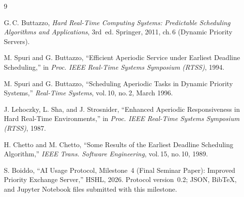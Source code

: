 \documentclass[conference]{IEEEtran}
\begin{document}
\begin{thebibliography}{9}

G.\,C. Buttazzo,
\emph{Hard Real-Time Computing Systems: Predictable Scheduling
  Algorithms and Applications}, 3rd~ed.
Springer, 2011, ch.\,6 (Dynamic Priority Servers).

M. Spuri and G. Buttazzo,
``Efficient Aperiodic Service under Earliest Deadline
  Scheduling,''
in \emph{Proc. IEEE Real-Time Systems Symposium (RTSS)}, 1994.

M. Spuri and G. Buttazzo,
``Scheduling Aperiodic Tasks in Dynamic Priority Systems,''
\emph{Real-Time Systems}, vol.\,10, no.\,2, March 1996.

J. Lehoczky, L. Sha, and J. Strosnider,
``Enhanced Aperiodic Responsiveness in Hard Real-Time
  Environments,''
in \emph{Proc. IEEE Real-Time Systems Symposium (RTSS)}, 1987.

H. Chetto and M. Chetto,
``Some Results of the Earliest Deadline Scheduling
  Algorithm,''
\emph{IEEE Trans. Software Engineering}, vol.\,15, no.\,10,
1989.

S. Boiddo,
``AI Usage Protocol, Milestone~4 (Final Seminar Paper):
  Improved Priority Exchange Server,''
HSHL, 2026. Protocol version~0.2; JSON, BibTeX, and Jupyter
Notebook files submitted with this milestone.

\end{thebibliography}
\end{document}
